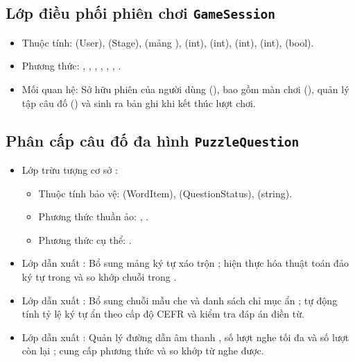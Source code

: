 \subsection{Lớp điều phối phiên chơi \texttt{GameSession}}
\label{subsec:gamesession}
\begin{itemize}
    \item Thuộc tính:  (User),  (Stage),  (mảng ),  (int),  (int),  (int),  (int),  (bool).
    \item Phương thức: , , , , , , .
    \item Mối quan hệ: Sở hữu phiên của người dùng (), bao gồm màn chơi (), quản lý tập câu đố () và sinh ra bản ghi  khi kết thúc lượt chơi.
\end{itemize}

\subsection{Phân cấp câu đố đa hình \texttt{PuzzleQuestion}}
\label{subsec:puzzlequestion_hierarchy}
\begin{itemize}
    \item Lớp trừu tượng cơ sở :
    \begin{itemize}
        \item Thuộc tính bảo vệ:  (WordItem),  (QuestionStatus),  (string).
        \item Phương thức thuần ảo: , .
        \item Phương thức cụ thể: .
    \end{itemize}
    \item Lớp dẫn xuất : Bổ sung mảng ký tự xáo trộn ; hiện thực hóa thuật toán đảo ký tự trong  và so khớp chuỗi trong .
    \item Lớp dẫn xuất : Bổ sung chuỗi mẫu che  và danh sách chỉ mục ẩn ; tự động tính tỷ lệ ký tự ẩn theo cấp độ CEFR và kiểm tra đáp án điền từ.
    \item Lớp dẫn xuất : Quản lý đường dẫn âm thanh , số lượt nghe tối đa  và số lượt còn lại ; cung cấp phương thức  và so khớp từ nghe được.
\end{itemize}

